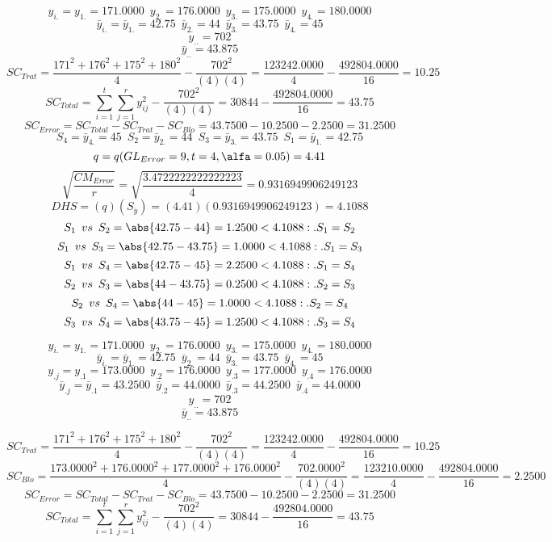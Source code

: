 % 
% 
% 
% 
% 
% 
% 
$$y_{i.}=y_{1.}=171.0000 \enspace y_{2.}=176.0000 \enspace y_{3.}=175.0000 \enspace y_{4.}=180.0000$$
$$\bar{y}_{i.}=\bar{y}_{1.}=42.75 \enspace \bar{y}_{2.}=44 \enspace \bar{y}_{3.}=43.75 \enspace \bar{y}_{4.}=45$$
$$y_{..}=702$$
$$\bar{y}_{..}=43.875$$
$$SC_{Trat}=\frac{171^{2}+176^{2}+175^{2}+180^{2}}{4}-\frac{702^{2}}{(4)(4)}=\frac{123242.0000}{4}-\frac{492804.0000}{16}=10.25$$
$$SC_{Total}=\sum_{i=1}^{\mathit{t}}\sum_{j=1}^{\mathit{r}}y_{ij}^{2}-\frac{702^{2}}{(4)(4)}=30844-\frac{492804.0000}{16}=43.75$$
$$SC_{Error}=SC_{Total}-SC_{Trat}-SC_{Blo}=43.7500-10.2500-2.2500=31.2500$$
$$S_{4}=\bar{y}_{4.}=45 \enspace S_{2}=\bar{y}_{2.}=44 \enspace S_{3}=\bar{y}_{3.}=43.75 \enspace S_{1}=\bar{y}_{1.}=42.75$$
$$q=q(GL_{Error}=9, t=4, \alfa=0.05)=4.41$$
$$\sqrt{\frac{CM_{Error}}{r}}=\sqrt{\frac{3.4722222222222223}{4}}=0.9316949906249123$$
$$DHS=(q)(S_{\bar{y}})=(4.41)(0.9316949906249123)=4.1088$$
$$S_{1} \enspace vs \enspace S_{2} = \abs{42.75-44}=1.2500<4.1088:.S_{1}=S_{2}$$
$$S_{1} \enspace vs \enspace S_{3} = \abs{42.75-43.75}=1.0000<4.1088:.S_{1}=S_{3}$$
$$S_{1} \enspace vs \enspace S_{4} = \abs{42.75-45}=2.2500<4.1088:.S_{1}=S_{4}$$
$$S_{2} \enspace vs \enspace S_{3} = \abs{44-43.75}=0.2500<4.1088:.S_{2}=S_{3}$$
$$S_{2} \enspace vs \enspace S_{4} = \abs{44-45}=1.0000<4.1088:.S_{2}=S_{4}$$
$$S_{3} \enspace vs \enspace S_{4} = \abs{43.75-45}=1.2500<4.1088:.S_{3}=S_{4}$$


$$y_{i.}=y_{1.}=171.0000 \enspace y_{2.}=176.0000 \enspace y_{3.}=175.0000 \enspace y_{4.}=180.0000$$
$$\bar{y}_{i.}=\bar{y}_{1.}=42.75 \enspace \bar{y}_{2.}=44 \enspace \bar{y}_{3.}=43.75 \enspace \bar{y}_{4.}=45$$
$$y_{.j}=y_{.1}=173.0000 \enspace y_{.2}=176.0000 \enspace y_{.3}=177.0000 \enspace y_{.4}=176.0000$$
$$\bar{y}_{.j}=\bar{y}_{.1}=43.2500 \enspace \bar{y}_{.2}=44.0000 \enspace \bar{y}_{.3}=44.2500 \enspace \bar{y}_{.4}=44.0000$$
$$y_{..}=702$$
$$\bar{y}_{..}=43.875$$

$$SC_{Trat}=\frac{171^{2}+176^{2}+175^{2}+180^{2}}{4}-\frac{702^{2}}{(4)(4)}=\frac{123242.0000}{4}-\frac{492804.0000}{16}=10.25$$
$$SC_{Blo}=\frac{173.0000^{2}+176.0000^{2}+177.0000^{2}+176.0000^{2}}{4}-\frac{702.0000^{2}}{(4)(4)}=\frac{123210.0000}{4}-\frac{492804.0000}{16}=2.2500$$
$$SC_{Error}=SC_{Total}-SC_{Trat}-SC_{Blo}=43.7500-10.2500-2.2500=31.2500$$
$$SC_{Total}=\sum_{i=1}^{\mathit{t}}\sum_{j=1}^{\mathit{r}}y_{ij}^{2}-\frac{702^{2}}{(4)(4)}=30844-\frac{492804.0000}{16}=43.75$$

